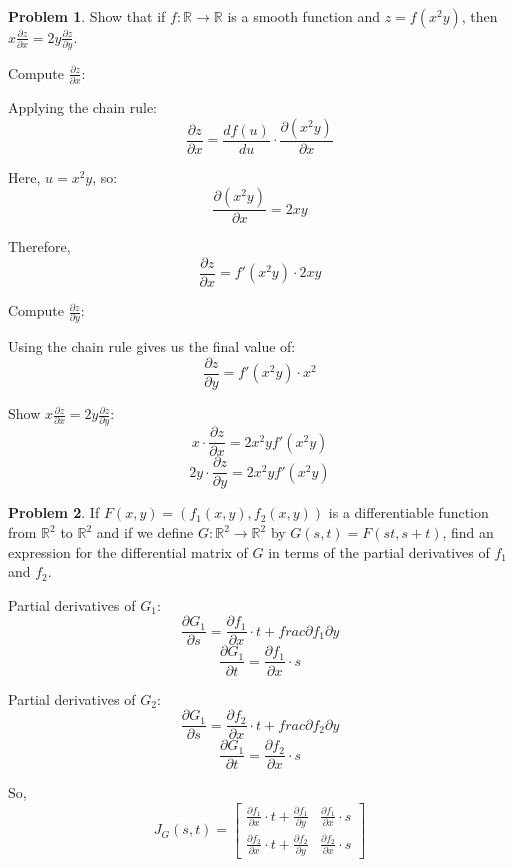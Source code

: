 \documentclass[12]{amsart}
\theoremstyle{definition}
\newtheorem{xca}{Problem}
\newcommand{\R}{\mathbb{R}}
\newcommand{\sskip}{\newpage%
}
\newcommand{\der}[2]{\frac{\partial#1}{\partial #2}}
\begin{document}
\sskip

\begin{xca}
Show that if $f:\R\to\R$ is a smooth function and $z=f(x^2y)$, then $x\der{z}{x}=2y\der{z}{y}.$
  \end{xca}


Compute $\frac{\partial z}{\partial x}$:

Applying the chain rule:
\[\frac{\partial z}{\partial x} = \frac{d f(u)}{du} \cdot \frac{\partial (x^2 y)}{\partial x}\]

Here, $u = x^2 y$, so:
\[\frac{\partial (x^2 y)}{\partial x} = 2xy\]

Therefore,
\[\frac{\partial z}{\partial x} = f'(x^2 y) \cdot 2xy\]


Compute $\frac{\partial z}{\partial y}$:

Using the chain rule gives us the final value of:
\[\frac{\partial z}{\partial y} = f'(x^2 y) \cdot x^2\]


Show $x \frac{\partial z}{\partial x} = 2y \frac{\partial z}{\partial y}$:
\[x \cdot \frac{\partial z}{\partial x} = 2x^2 y f'(x^2 y)\]
\[2y \cdot \frac{\partial z}{\partial y} = 2x^2 y f'(x^2 y)\]


\sskip
\begin{xca} %

\bigskip

If $F(x,y)=(f_1(x,y), f_2(x,y))$ is a differentiable function from $\R^2$ to $\R^2$ and if we define
$G:\R^2\to\R^2$ by $G(s,t)=F(st,s+t)$, find an expression for the differential matrix of $G$ in terms of the partial derivatives
of $f_1$ and $f_2$.


\end{xca}


Partial derivatives of $G_1$:
\[\frac{\partial G_1}{\partial s} = \frac{\partial f_1}{\partial x} \cdot t + frac{\partial f_1}{\partial y}\]
\[\frac{\partial G_1}{\partial t} = \frac{\partial f_1}{\partial x} \cdot s\]

Partial derivatives of $G_2$:
\[\frac{\partial G_1}{\partial s} = \frac{\partial f_2}{\partial x} \cdot t + frac{\partial f_2}{\partial y}\]
\[\frac{\partial G_1}{\partial t} = \frac{\partial f_2}{\partial x} \cdot s\]

So,
\[J_G(s, t) = \begin{bmatrix}
    \frac{\partial f_1}{\partial x} \cdot t + \frac{\partial f_1}{\partial y} & \frac{\partial f_1}{\partial x} \cdot s \\
    \frac{\partial f_2}{\partial x} \cdot t + \frac{\partial f_2}{\partial y} & \frac{\partial f_2}{\partial x} \cdot s
\end{bmatrix}\]
\end{document}
